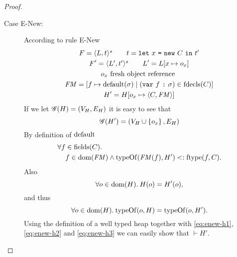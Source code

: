 \begin{proof}
\begin{description}
\begin{description}
\begin{description}
            \item[Case {\sc E-New}:] According to rule {\sc E-New}
              \begin{equation} \label{eq:enew1}
                \begin{gathered} 
                  F = \mbox{$\langle L, t \rangle^s$} \quad\quad t = \mbox{\mdseries\texttt{let}~$x$~\texttt{=}~$\mbox{\mdseries\texttt{new}~$C$}$~\texttt{in}~$t'$} \\
                  F' = \mbox{$\langle L', t' \rangle^s$} \quad\quad L' = L[x \mapsto o_x] \\
                  o_x \text{ fresh object reference } \\
                  \mathit{FM} = [f \mapsto \mbox{$\mathrm{default}$}(\sigma) \mid (\mbox{\mdseries\texttt{var}~$f$~\texttt{:}~$\sigma$}) \in
                  \mbox{$\mathrm{fdecls}$}(C)] \\
                  H' = H[o_x \mapsto \mbox{$\langle C, \mathit{FM} \rangle$}]
                \end{gathered}
              \end{equation}
              If we let $\mathscr{G}(H) = (V_H, E_H)$ it is easy to see that
              \begin{equation}
                \mathscr{G}(H') = ( V_H \cup \left\{ o_x \right\}, E_H )
              \end{equation}
              By definition of $\mbox{$\mathrm{default}$}$
              \begin{equation} \label{eq:enew-h1}
                \begin{aligned}
                  \forall f &\in \mbox{$\mathrm{fields}$}(C).\\
                  &f \in \mbox{$\mathrm{dom}$}(\mathit{FM}) \land \mbox{$\mathrm{typeOf}$}(\mathit{FM}(f), H') <: \mbox{$\mathrm{ftype}$}(f, C).
                \end{aligned}
              \end{equation}
              Also
              \begin{equation}
                \forall o \in \mbox{$\mathrm{dom}$}(H). \: H(o) = H'(o) \label{eq:enew-h2},
              \end{equation}
              and thus
              \begin{equation}
                \forall o \in \mbox{$\mathrm{dom}$}(H). \: \mbox{$\mathrm{typeOf}$}(o, H) = \mbox{$\mathrm{typeOf}$}(o, H').
                \label{eq:enew-h3}
              \end{equation}
              Using the definition of a well typed heap together with
              \eqref{eq:enew-h1}, \eqref{eq:enew-h2} and \eqref{eq:enew-h3} we
              can easily show that $\vdash H'$.


\end{description}
\end{description}
\end{description}
\end{proof}
